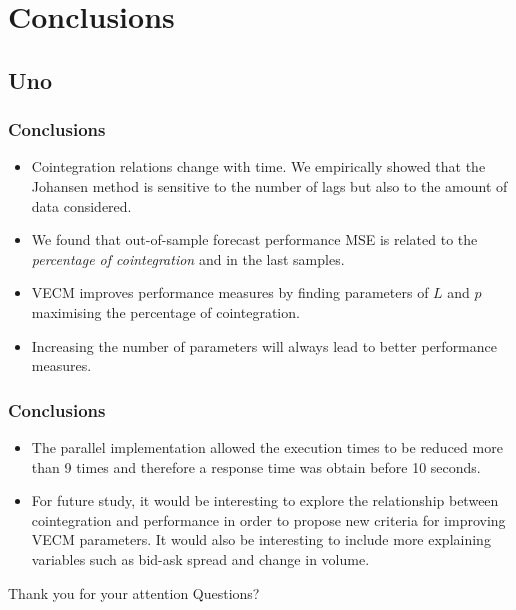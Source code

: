 \documentclass[compress,red]{beamer}
\begin{document}
\section{Conclusions}
\subsection{Uno}
\begin{frame}
\frametitle{Conclusions}
\begin{itemize}
\item Cointegration relations change with time. We empirically showed that the Johansen method is sensitive to the number of lags but also to the amount of data considered.
\item We found that out-of-sample forecast performance MSE is related to the {\em percentage of cointegration\/} and in the last samples.  
\item VECM improves performance measures by finding
parameters of $L$ and $p$ maximising the percentage of cointegration.
\item Increasing the number of parameters will always lead to
better performance measures.
\end{itemize}
\end{frame}

\begin{frame}
\frametitle{Conclusions}
\begin{itemize}
\item The parallel implementation allowed the execution times to be reduced
more than 9 times and therefore a response time was obtain before 10
seconds. 
\item For future study, it would be interesting to explore the relationship between
cointegration and performance in order to propose new criteria for
improving VECM parameters. It would also be interesting to include more 
explaining variables such as bid-ask spread and change in volume.
\end{itemize}
\end{frame}

\begin{frame}[plain,c]
\begin{center}
\Huge Thank you for your attention
\Huge Questions?
\end{center}
\end{frame}
\end{document}
